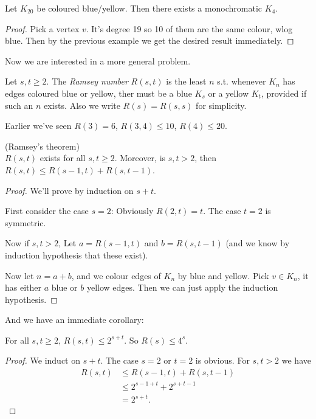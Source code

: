 \documentclass[a4paper]{article}
\begin{document}
\begin{prop}
Let $K_{20}$ be coloured blue/yellow. Then there exists a monochromatic $K_4$.
\begin{proof}
Pick a vertex $v$. It's degree 19 so 10 of them are the same colour, wlog blue. Then by the previous example we get the desired result immediately.
\end{proof}
\end{prop}

Now we are interested in a more general problem.

\begin{defi}
Let $s,t \geq 2$. The \emph{Ramsey number} $R(s,t)$ is the least $n$ s.t. whenever $K_n$ has edges coloured blue or yellow, ther must be a blue $K_s$ or a yellow $K_t$, provided if such an $n$ exists. Also we write $R(s) = R(s,s)$ for simplicity.
\end{defi}

Earlier we've seen $R(3) = 6$, $R(3,4) \leq 10$, $R(4) \leq 20$.

\begin{thm} (Ramsey's theorem)\\
$R(s,t)$ exists for all $s,t \geq 2$. Moreover, is $s,t > 2$, then $R(s,t) \leq R(s-1,t)+R(s,t-1)$.
\begin{proof}
We'll prove by induction on $s+t$.

First consider the case $s=2$: Obviously $R(2,t)=t$. The case $t=2$ is symmetric.

Now if $s,t>2$, Let $a=R(s-1,t)$ and $b=R(s,t-1)$ (and we know by induction hypothesis that these exist).

Now let $n=a+b$, and we colour edges of $K_n$ by blue and yellow. Pick $v\in K_n$, it has either $a$ blue or $b$ yellow edges. Then we can just apply the induction hypothesis.
\end{proof}
\end{thm}

And we have an immediate corollary:

\begin{coro}
For all $s,t \geq 2$, $R(s,t) \leq 2^{s+t}$. So $R(s) \leq 4^s$.
\begin{proof}
We induct on $s+t$. The case $s=2$ or $t=2$ is obvious. For $s,t>2$ we have
\begin{equation*}
\begin{aligned}
R(s,t) &\leq R(s-1,t) + R(s,t-1)\\
&\leq 2^{s-1+t}+2^{s+t-1}\\
&=2^{s+t}.
\end{aligned}
\end{equation*}
\end{proof}
\end{coro}
\end{document}
